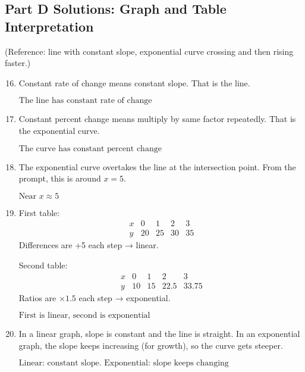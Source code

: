 \documentclass[12pt]{article}
\begin{document}
\subsection*{Part D Solutions: Graph and Table Interpretation}
(Reference: line with constant slope, exponential curve crossing and then rising faster.)

\begin{enumerate}
  \setcounter{enumi}{15}
  \item Constant rate of change means constant slope. That is the line.

  \(\boxed{\text{The line has constant rate of change}}\)

  \item Constant percent change means multiply by same factor repeatedly. That is the exponential curve.

  \(\boxed{\text{The curve has constant percent change}}\)

  \item The exponential curve overtakes the line at the intersection point. From the prompt, this is around \(x = 5\).

  \(\boxed{\text{Near } x \approx 5}\)

  \item First table:
  \[
  \begin{array}{c|cccc}
  x & 0 & 1 & 2 & 3 \\ \hline
  y & 20 & 25 & 30 & 35
  \end{array}
  \]
  Differences are +5 each step → linear.

  Second table:
  \[
  \begin{array}{c|cccc}
  x & 0 & 1 & 2 & 3 \\ \hline
  y & 10 & 15 & 22.5 & 33.75
  \end{array}
  \]
  Ratios are \(\times 1.5\) each step → exponential.

  \(\boxed{\text{First is linear, second is exponential}}\)

  \item In a linear graph, slope is constant and the line is straight.  
  In an exponential graph, the slope keeps increasing (for growth), so the curve gets steeper.

  \(\boxed{\text{Linear: constant slope. Exponential: slope keeps changing}}\)
\end{enumerate}
\end{document}
